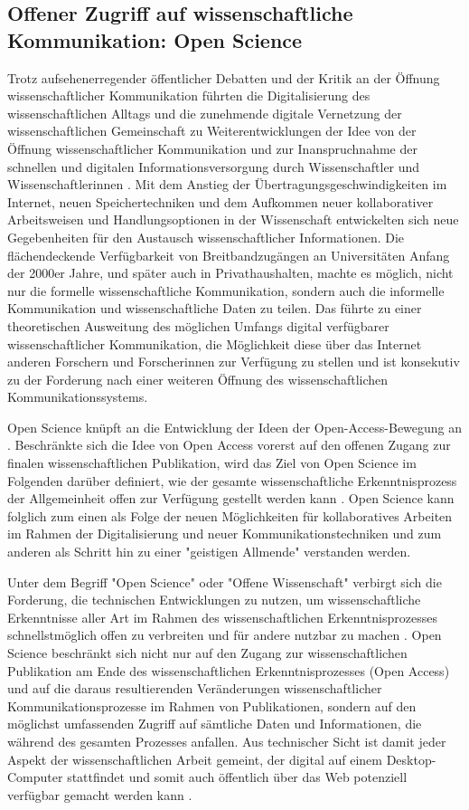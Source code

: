 \subsection{Offener Zugriff auf wissenschaftliche Kommunikation: Open Science}

Trotz aufsehenerregender öffentlicher Debatten und der Kritik an der Öffnung wissenschaftlicher Kommunikation führten die Digitalisierung des wissenschaftlichen Alltags und die zunehmende digitale Vernetzung der wissenschaftlichen Gemeinschaft zu Weiterentwicklungen der Idee von der Öffnung wissenschaftlicher Kommunikation und zur Inanspruchnahme der schnellen und digitalen Informationsversorgung durch Wissenschaftler und Wissenschaftlerinnen \cite{Winkler_2011}. Mit dem Anstieg der Übertragungsgeschwindigkeiten im Internet, neuen Speichertechniken und dem Aufkommen neuer kollaborativer Arbeitsweisen und Handlungsoptionen in der Wissenschaft entwickelten sich neue Gegebenheiten für den Austausch wissenschaftlicher Informationen. Die flächendeckende Verfügbarkeit von Breitbandzugängen an Universitäten Anfang der 2000er Jahre, und später auch in Privathaushalten, machte es möglich, nicht nur die formelle wissenschaftliche Kommunikation, sondern auch die informelle Kommunikation und wissenschaftliche Daten zu teilen. Das führte zu einer theoretischen Ausweitung des möglichen Umfangs digital verfügbarer wissenschaftlicher Kommunikation, die Möglichkeit diese über das Internet anderen Forschern und Forscherinnen zur Verfügung zu stellen und ist konsekutiv zu der Forderung nach einer weiteren Öffnung des wissenschaftlichen Kommunikationssystems.

Open Science knüpft an die Entwicklung der Ideen der Open-Access-Bewegung an \cite{Garcia_2010}. Beschränkte sich die Idee von Open Access vorerst auf den offenen Zugang zur finalen wissenschaftlichen Publikation, wird das Ziel von Open Science im Folgenden darüber definiert, wie der gesamte wissenschaftliche Erkenntnisprozess der Allgemeinheit offen zur Verfügung gestellt werden kann \cite{Grand_2012}. Open Science kann folglich zum einen als Folge der neuen Möglichkeiten für kollaboratives Arbeiten im Rahmen der Digitalisierung und neuer Kommunikationstechniken und zum anderen als Schritt hin zu einer "geistigen Allmende" \cite{Naeder_2010} verstanden werden.

Unter dem Begriff "Open Science" oder "Offene Wissenschaft" verbirgt sich die Forderung, die technischen Entwicklungen zu nutzen, um wissenschaftliche Erkenntnisse aller Art im Rahmen des wissenschaftlichen Erkenntnisprozesses schnellstmöglich offen zu verbreiten und für andere nutzbar zu machen \cite{Stafford_2010}. Open Science beschränkt sich nicht nur auf den Zugang zur wissenschaftlichen Publikation am Ende des wissenschaftlichen Erkenntnisprozesses (Open Access) und auf die daraus resultierenden Veränderungen wissenschaftlicher Kommunikationsprozesse im Rahmen von Publikationen, sondern auf den möglichst umfassenden Zugriff auf sämtliche Daten und Informationen, die während des gesamten Prozesses anfallen. Aus technischer Sicht ist damit jeder Aspekt der wissenschaftlichen Arbeit gemeint, der digital auf einem Desktop-Computer stattfindet und somit auch öffentlich über das Web potenziell verfügbar gemacht werden kann \cite{Mietchen_2012}.

